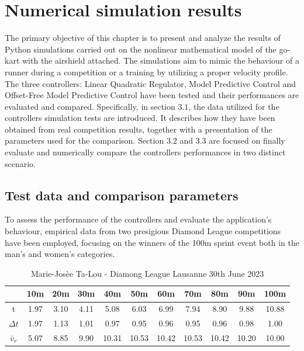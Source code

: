 \documentclass[a4paper,12pt,oneside]{book}
\begin{document}
\chapter{Numerical simulation results}
\label{chapter:Simulations_results}
The primary objective of this chapter is to present and analyze the results of Python simulations carried out on the nonlinear mathematical model of the go-kart with the airshield attached.
The simulations aim to mimic the behaviour of a runner during a competition or a training by utilizing a proper velocity profile.
The three controllers: Linear Quadratic Regulator, Model Predictive Control and Offset-Free Model Predictive Control have been tested and their performances are evaluated and compared.
Specifically, in section $3.1$, the data utilized for the controllers simulation tests are introduced.
It describes how they have been obtained from real competition results, together with a presentation of the parameters used for the comparison.
Section $3.2$ and $3.3$ are focused on finally evaluate and numerically compare the controllers performances in two distinct scenario.

\section{Test data and comparison parameters}
To assess the performance of the controllers and evaluate the application's behaviour, empirical data from two presigious Diamond League competitions \cite{diamondleague} have been employed, focusing on the winners of the 100m sprint event both in the man's and women's categories. 

\begin{table}[h!]
	\centering
	\begin{adjustbox}{max width=\textwidth}
	\begin{tabular}{c|c|c|c|c|c|c|c|c|c|c}
           & 10m & 20m & 30m & 40m & 50m & 60m & 70m & 80m & 90m &100m \\
	\hline
	\hline
	t & 1.97 & 3.10 & 4.11 & 5.08 & 6.03 & 6.99 & 7.94 & 8.90 & 9.88 & 10.88  \\	
	$\Delta t$ & 1.97 & 1.13 & 1.01 & 0.97 & 0.95 & 0.96 & 0.95 & 0.96 & 0.98 & 1.00 \\
	$\bar{v}_r$ & 5.07 & 8.85 & 9.90 & 10.31 & 10.53 & 10.42 & 10.53 & 10.42 & 10.20 & 10.00 \\
	\hline
	\end{tabular}
	\end{adjustbox}
\caption{Marie-Josèe Ta-Lou - Diamong League Lausanne 30th June 2023}
\label{tab:Women}
\end{table}
\end{document}
